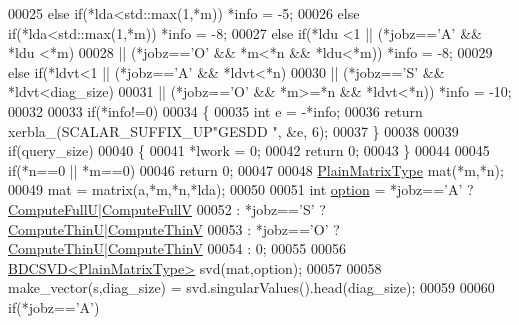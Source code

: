 \begin{DoxyCode}
00025   \textcolor{keywordflow}{else}  \textcolor{keywordflow}{if}(*lda<std::max(1,*m))                                   *info = -5;
00026   \textcolor{keywordflow}{else}  \textcolor{keywordflow}{if}(*lda<std::max(1,*m))                                   *info = -8;
00027   \textcolor{keywordflow}{else}  \textcolor{keywordflow}{if}(*ldu <1 || (*jobz==\textcolor{charliteral}{'A'} && *ldu <*m)
00028                    || (*jobz==\textcolor{charliteral}{'O'} && *m<*n && *ldu<*m))           *info = -8;
00029   \textcolor{keywordflow}{else}  \textcolor{keywordflow}{if}(*ldvt<1 || (*jobz==\textcolor{charliteral}{'A'} && *ldvt<*n)
00030                    || (*jobz==\textcolor{charliteral}{'S'} && *ldvt<diag\_size)
00031                    || (*jobz==\textcolor{charliteral}{'O'} && *m>=*n && *ldvt<*n))         *info = -10;
00032   
00033   \textcolor{keywordflow}{if}(*info!=0)
00034   \{
00035     \textcolor{keywordtype}{int} e = -*info;
00036     \textcolor{keywordflow}{return} xerbla\_(SCALAR\_SUFFIX\_UP\textcolor{stringliteral}{"GESDD "}, &e, 6);
00037   \}
00038   
00039   \textcolor{keywordflow}{if}(query\_size)
00040   \{
00041     *lwork = 0;
00042     \textcolor{keywordflow}{return} 0;
00043   \}
00044   
00045   \textcolor{keywordflow}{if}(*n==0 || *m==0)
00046     \textcolor{keywordflow}{return} 0;
00047   
00048   \hyperlink{group___core___module_class_eigen_1_1_matrix}{PlainMatrixType} mat(*m,*n);
00049   mat = matrix(a,*m,*n,*lda);
00050   
00051   \textcolor{keywordtype}{int} \hyperlink{structoption}{option} = *jobz==\textcolor{charliteral}{'A'} ? \hyperlink{group__enums_ggae3e239fb70022eb8747994cf5d68b4a9a2b4f91ca5859a4159dbfe8090043817f}{ComputeFullU}|\hyperlink{group__enums_ggae3e239fb70022eb8747994cf5d68b4a9a52c6f7e80bbf9a42297c88f700245b51}{ComputeFullV}
00052              : *jobz==\textcolor{charliteral}{'S'} ? \hyperlink{group__enums_ggae3e239fb70022eb8747994cf5d68b4a9af8c742a1aa87773e165eae406c9ccaf8}{ComputeThinU}|\hyperlink{group__enums_ggae3e239fb70022eb8747994cf5d68b4a9a1055e53fa95c8ae04a07ebb72cfafd95}{ComputeThinV}
00053              : *jobz==\textcolor{charliteral}{'O'} ? \hyperlink{group__enums_ggae3e239fb70022eb8747994cf5d68b4a9af8c742a1aa87773e165eae406c9ccaf8}{ComputeThinU}|\hyperlink{group__enums_ggae3e239fb70022eb8747994cf5d68b4a9a1055e53fa95c8ae04a07ebb72cfafd95}{ComputeThinV}
00054              : 0;
00055 
00056   \hyperlink{group___s_v_d___module_class_eigen_1_1_b_d_c_s_v_d}{BDCSVD<PlainMatrixType>} svd(mat,option);
00057   
00058   make\_vector(s,diag\_size) = svd.singularValues().head(diag\_size);
00059 
00060   \textcolor{keywordflow}{if}(*jobz==\textcolor{charliteral}{'A'})

\end{DoxyCode}
